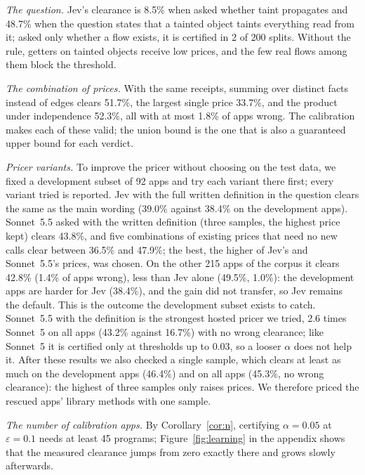\begin{table}[t]
\caption{Ranking quality (AUROC of the bound, real flows against leak-free sinks) and certified clearance over 200 half splits.}
\label{tab:rank}
\small

\end{table}

\emph{The question.}
Jev's clearance is 8.5\% when asked whether taint propagates and 48.7\% when the question states that a tainted object taints everything read from it; asked only whether a flow exists, it is certified in 2 of 200 splits.
Without the rule, getters on tainted objects receive low prices, and the few real flows among them block the threshold.

\emph{The combination of prices.}
With the same receipts, summing over distinct facts instead of edges clears 51.7\%, the largest single price 33.7\%, and the product under independence 52.3\%, all with at most 1.8\% of apps wrong.
The calibration makes each of these valid; the union bound is the one that is also a guaranteed upper bound for each verdict.

\emph{Pricer variants.}
To improve the pricer without choosing on the test data, we fixed a development subset of 92 apps and try each variant there first; every variant tried is reported.
Jev with the full written definition in the question clears the same as the main wording (39.0\% against 38.4\% on the development apps).
Sonnet~5.5 asked with the written definition (three samples, the highest price kept) clears 43.8\%, and five combinations of existing prices that need no new calls clear between 36.5\% and 47.9\%; the best, the higher of Jev's and Sonnet~5.5's prices, was chosen.
On the other 215 apps of the corpus it clears 42.8\% (1.4\% of apps wrong), less than Jev alone (49.5\%, 1.0\%): the development apps are harder for Jev (38.4\%), and the gain did not transfer, so Jev remains the default.
This is the outcome the development subset exists to catch.
Sonnet~5.5 with the definition is the strongest hosted pricer we tried, 2.6 times Sonnet~5 on all apps (43.2\% against 16.7\%) with no wrong clearance; like Sonnet~5 it is certified only at thresholds up to 0.03, so a looser $\alpha$ does not help it.
After these results we also checked a single sample, which clears at least as much on the development apps (46.4\%) and on all apps (45.3\%, no wrong clearance): the highest of three samples only raises prices. We therefore priced the rescued apps' library methods with one sample.

\emph{The number of calibration apps.}
By Corollary~\ref{cor:n}, certifying $\alpha=0.05$ at $\varepsilon=0.1$ needs at least 45 programs; Figure~\ref{fig:learning} in the appendix shows that the measured clearance jumps from zero exactly there and grows slowly afterwards.

